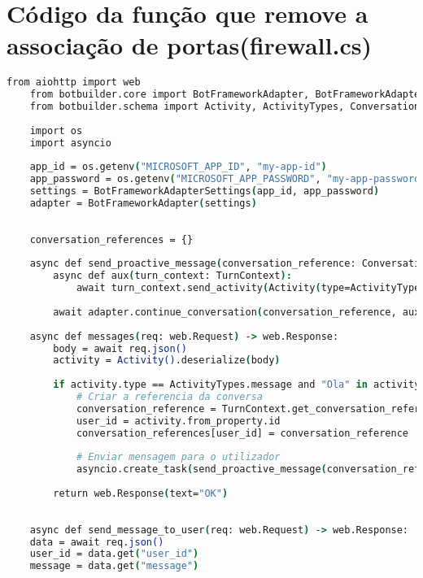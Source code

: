 
\chapter{Código da função que remove a associação de portas(firewall.cs)}
\label{chap:zf}



\begin{lstlisting}[language=csh, caption={Envio de notificação via Microsoft Teams}]
    from aiohttp import web
    from botbuilder.core import BotFrameworkAdapter, BotFrameworkAdapterSettings, TurnContext
    from botbuilder.schema import Activity, ActivityTypes, ConversationReference
    
    import os
    import asyncio
    
    app_id = os.getenv("MICROSOFT_APP_ID", "my-app-id")
    app_password = os.getenv("MICROSOFT_APP_PASSWORD", "my-app-password")
    settings = BotFrameworkAdapterSettings(app_id, app_password)
    adapter = BotFrameworkAdapter(settings)
    
    
    conversation_references = {}
    
    async def send_proactive_message(conversation_reference: ConversationReference, message: str):
        async def aux(turn_context: TurnContext):
            await turn_context.send_activity(Activity(type=ActivityTypes.message, text=message))
    
        await adapter.continue_conversation(conversation_reference, aux, app_id)
    
    async def messages(req: web.Request) -> web.Response:
        body = await req.json()
        activity = Activity().deserialize(body)
    
        if activity.type == ActivityTypes.message and "Ola" in activity.text:
            # Criar a referencia da conversa
            conversation_reference = TurnContext.get_conversation_reference(activity)
            user_id = activity.from_property.id
            conversation_references[user_id] = conversation_reference
    
            # Enviar mensagem para o utilizador
            asyncio.create_task(send_proactive_message(conversation_reference, "Ola! o seu pedido foi concluido."))
    
        return web.Response(text="OK")
    
    
    async def send_message_to_user(req: web.Request) -> web.Response:
    data = await req.json()
    user_id = data.get("user_id")
    message = data.get("message")
    

\end{lstlisting}
